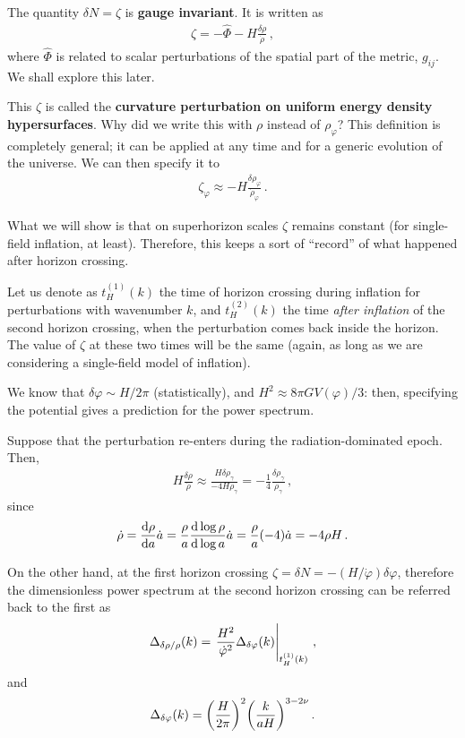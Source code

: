 \documentclass[main.tex]{subfiles}
\begin{document}
The quantity \(\delta N = \zeta\) is \textbf{gauge invariant}. It is written as 
%
\begin{align}
\zeta = - \hat{\Phi} - H \frac{ \delta \rho }{\dot{\rho} }
\,,
\end{align}
%
where \(\hat{\Phi}\) is related to scalar perturbations  of the spatial part of the metric, \(g_{ij}\). We shall explore this later. 

This \(\zeta\) is called the \textbf{curvature perturbation on uniform energy density hypersurfaces}.
Why did we write this with \(\rho \) instead of \(\rho _\varphi \)? This definition is completely general; it can be applied at any time and for a generic evolution of the universe. 
We can then specify it to 
%
\begin{align}
\zeta_\varphi \approx - H \frac{ \delta \rho _\varphi }{\dot{\rho}_\varphi }
\,.
\end{align}

What we will show is that on superhorizon scales \(\zeta\) remains constant (for single-field inflation, at least). 
Therefore, this keeps a sort of ``record'' of what happened after horizon crossing.

Let us denote as \(t^{(1)}_H(k)\) the time of horizon crossing during inflation for perturbations with wavenumber \(k\), and \(t^{(2)}_H(k)\) the time \emph{after inflation} of the second horizon crossing, when the perturbation comes back inside the horizon.  
The value of \(\zeta \) at these two times will be the same (again, as long as we are considering a single-field model of inflation).

We know that \(\delta \varphi \sim H / 2 \pi \) (statistically), and \(H^2 \approx 8 \pi G V(\varphi ) /3\): then, specifying the potential gives a prediction for the power spectrum. 

Suppose that the perturbation re-enters during the radiation-dominated epoch. Then, 
%
\begin{align}
H \frac{ \delta \rho }{\dot{\rho} } \approx \frac{H \delta \rho _\gamma }{-4 H \rho _\gamma } = - \frac{1}{4}\frac{ \delta \rho _\gamma }{\rho _\gamma }
\,,
\end{align}
%
since 
%
\begin{align}
\dot{\rho} = \dv{\rho }{a} \dot{a} = \frac{\rho}{a} \dv{\log \rho }{\log a} \dot{a} = \frac{\rho}{a} (-4) \dot{a} = - 4 \rho H
\,.
\end{align}

On the other hand, at the first horizon crossing \(\zeta = \delta N = - (H / \dot{\varphi}) \delta \varphi \), therefore the dimensionless power spectrum at the second horizon crossing can be referred back to the first as 
%
\begin{align}
\Delta_{ \delta \rho / \rho } (k)= 
\eval{\frac{H^2}{ \dot{\varphi}^2} \Delta_{ \delta \varphi } (k)}_{t^{(1)}_H (k)} 
\,,
\end{align}
%
and 
%
\begin{align}
\Delta_{ \delta \varphi } (k) = \qty( \frac{H}{ 2 \pi })^2 \qty(\frac{k}{aH})^{3-2 \nu }
\,.
\end{align}
\end{document}

